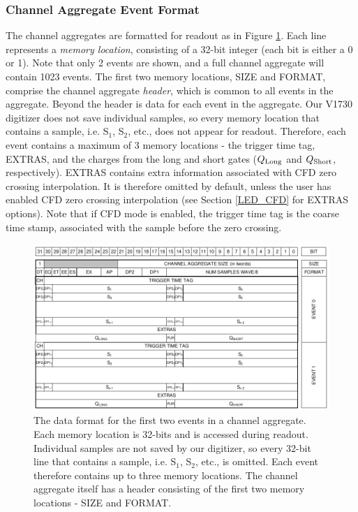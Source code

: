 \subsubsection{Channel Aggregate Event Format} \label{channel_agg}

The channel aggregates are formatted for readout as in Figure \ref{ChannelAgg}. Each line represents a \textit{memory location}, consisting of a 32-bit integer (each bit is either a 0 or 1). Note that only 2 events are shown, and a full channel aggregate will contain 1023 events. The first two memory locations, SIZE and FORMAT, comprise the channel aggregate \textit{header}, which is common to all events in the aggregate. Beyond the header is data for each event in the aggregate. Our V1730 digitizer does not save individual samples, so every memory location that contains a sample, i.e. S$_{1}$, S$_{2}$, etc., does not appear for readout. Therefore, each event contains a maximum of 3 memory locations - the trigger time tag, EXTRAS, and the charges from the long and short gates ($Q_{\textnormal{Long}}$ and $Q_{\textnormal{Short}}$, respectively). EXTRAS contains extra information associated with CFD zero crossing interpolation. It is therefore omitted by default, unless the user has enabled CFD zero crossing interpolation (see Section \ref{LED_CFD} for EXTRAS options). Note that if CFD mode is enabled, the trigger time tag is the coarse time stamp, associated with the sample before the zero crossing.

\begin{figure}[b!]
\centering
\includegraphics[scale=0.36]{Chapter-5/figs/ChannelAgg.png}
\caption{The data format for the first two events in a channel aggregate. Each memory location is 32-bits and is accessed during readout. Individual samples are not saved by our digitizer, so every 32-bit line that contains a sample, i.e. S$_{1}$, S$_{2}$, etc., is omitted. Each event therefore contains up to three memory locations. The channel aggregate itself has a header consisting of the first two memory locations - SIZE and FORMAT.}
\label{ChannelAgg}
\end{figure}


